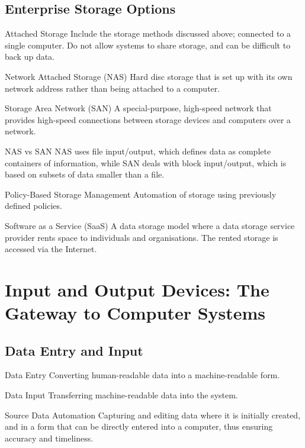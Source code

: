 \documentclass[\main/notes.tex]{subfiles}
\begin{document}
			\subsection{Enterprise Storage Options}
				\begin{sidenote}{Attached Storage}
					Include the storage methods discussed above; connected to a single computer. Do not allow systems to share storage, and can be difficult to back up data.
				\end{sidenote}
				\begin{definition}{Network Attached Storage (NAS)}
					Hard disc storage that is set up with its own network address rather than being attached to a computer.
				\end{definition}
				\begin{definition}{Storage Area Network (SAN)}
					A special-purpose, high-speed network that provides high-speed connections between storage devices and computers over a network.
				\end{definition}
				\begin{sidenote}{NAS vs SAN}
					NAS uses file input/output, which defines data as complete containers of information, while SAN deals with block input/output, which is based on subsets of data smaller than a file.
				\end{sidenote}
				\begin{definition}{Policy-Based Storage Management}
					Automation of storage using previously defined policies.
				\end{definition}
				\begin{definition}{Software as a Service (SaaS)}
					A data storage model where a data storage service provider rents space to individuals and organisations. The rented storage is accessed via the Internet.
				\end{definition}

		\section[Input and Output Devices]{Input and Output Devices: The Gateway to Computer Systems}
			\subsection{Data Entry and Input}
				\begin{definition}{Data Entry}
					Converting human-readable data into a machine-readable form.
				\end{definition}
				\begin{definition}{Data Input}
					Transferring machine-readable data into the system.
				\end{definition}
				\begin{definition}{Source Data Automation}
					Capturing and editing data where it is initially created, and in a form that can be directly entered into a computer, thus ensuring accuracy and timeliness.
				\end{definition}
\end{document}
